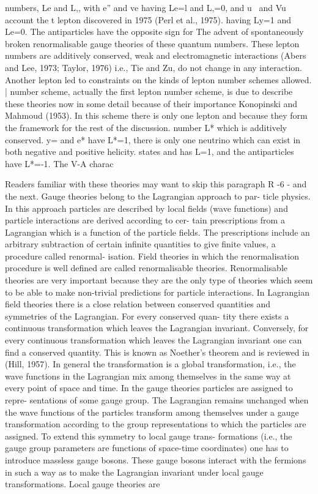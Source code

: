 \documentclass[twoside]{article}
\begin{document}
numbers, Le and L,, with e” and ve having Le=l and L,=0, and u~ and Vu account the t lepton discovered in 1975 (Perl et al., 1975).
having Ly=1 and Le=0. The antiparticles have the opposite sign for The advent of spontaneously broken renormalisable gauge theories of
these quantum numbers. These lepton numbers are additively conserved, weak and electromagnetic interactions (Abers and Lee, 1973; Taylor, 1976)
i.e., Tie and Zu, do not change in any interaction. Another lepton led to constraints on the kinds of lepton number schemes allowed. |
number scheme, actually the first lepton number scheme, is due to describe these theories now in some detail because of their importance
Konopinski and Mahmoud (1953). In this scheme there is only one lepton and because they form the framework for the rest of the discussion.
number L* which is additively conserved. y= and e* have L*=1, there is only one neutrino which can exist in both negative and positive helicity. states and has L=1, and the antiparticles have L*=-1. The V-A charac~

Readers familiar with these theories may want to skip this paragraph
R -6 -
and the next. Gauge theories belong to the Lagrangian approach to par-
ticle physics. In this approach particles are described by local fields
(wave functions) and particle interactions are derived according to cer-
tain prescriptions from a Lagrangian which is a function of the particle
fields. The prescriptions include an arbitrary subtraction of certain
infinite quantities to give finite values, a procedure called renormal-
isation. Field theories in which the renormalisation procedure is well
defined are called renormalisable theories. Renormalisable theories are
very important because they are the only type of theories which seem to
be able to make non-trivial predictions for particle interactions. In
Lagrangian field theories there is a close relation between conserved
quantities and symmetries of the Lagrangian. For every conserved quan-
tity there exists a continuous transformation which leaves the Lagrangian
invariant. Conversely, for every continuous transformation which leaves
the Lagrangian invariant one can find a conserved quantity. This is
known as Noether's theorem and is reviewed in (Hill, 1957). In general
the transformation is a global transformation, i.e., the wave functions
in the Lagrangian mix among themselves in the same way at every point of
space and time. In the gauge theories particles are assigned to repre-
sentations of some gauge group. The Lagrangian remains unchanged when
the wave functions of the particles transform among themselves under a
gauge transformation according to the group representations to which the
particles are assigned. To extend this symmetry to local gauge trans-
formations (i.e., the gauge group parameters are functions of space-time
coordinates) one has to introduce massless gauge bosons. These gauge
bosons interact with the fermions in such a way as to make the Lagrangian
invariant under local gauge transformations. Local gauge theories are
\end{document}
